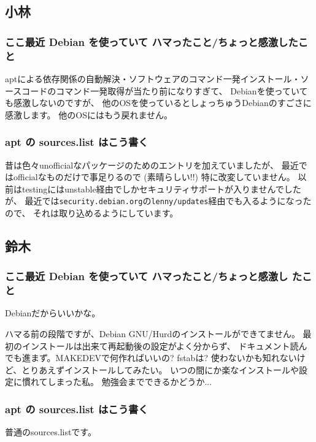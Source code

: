 \documentclass[mingoth,a4paper]{jsarticle}
\begin{document}
\subsection{小林}

\subsubsection{ここ最近 Debian を使っていて ハマったこと/ちょっと感激したこと}

aptによる依存関係の自動解決・ソフトウェアのコマンド一発インストール・ソースコードのコマンド一発取得が当たり前になりすぎて、
Debianを使っていても感激しないのですが、
他のOSを使っているとしょっちゅうDebianのすごさに感激します。
他のOSにはもう戻れません。

\subsubsection{apt の sources.list はこう書く}
昔は色々unofficialなパッケージのためのエントリを加えていましたが、
最近ではofficialなものだけで事足りるので (素晴らしい!!) 特に改変していません。
以前はtestingにはunstable経由でしかセキュリティサポートが入りませんでしたが、
最近では\texttt{security.debian.org}の\texttt{lenny/updates}経由でも入るようになったので、
それは取り込めるようにしています。

\subsection{鈴木}

\subsubsection{ここ最近 Debian を使っていて ハマったこと/ちょっと感激し
   たこと}

Debianだからいいかな。

ハマる前の段階ですが、Debian GNU/Hurdのインストールができてません。
最初のインストールは出来て再起動後の設定がよく分からず、
ドキュメント読んでも進まず。MAKEDEVで何作ればいいの? fstabは?
使わないかも知れないけど、とりあえずインストールしてみたい。
いつの間にか楽なインストールや設定に慣れてしまった私。
勉強会までできるかどうか...

\subsubsection{apt の sources.list はこう書く}

普通のsources.listです。
\end{document}
